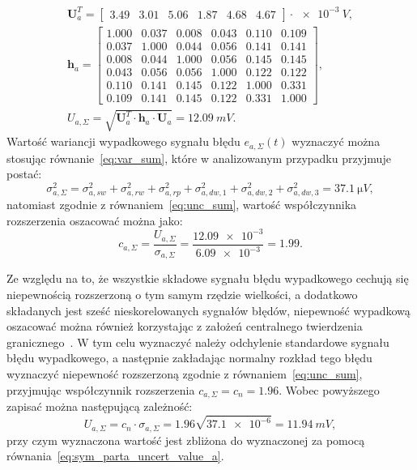\begin{gather}
\mathbf{U}_{a}^{T} =
\begin{bmatrix}
3.49 & 3.01 & 5.06 & 1.87 & 4.68 & 4.67
\end{bmatrix} \cdot \qty{e-3}{V}
\label{eq:sym_parta_uncert_vector_val}, \\
\mathbf{h}_{a} =
\begin{bmatrix}
1.000 & 0.037 & 0.008 & 0.043 & 0.110 & 0.109 \\
0.037 & 1.000 & 0.044 & 0.056 & 0.141 & 0.141 \\
0.008 & 0.044 & 1.000 & 0.056 & 0.145 & 0.145 \\
0.043 & 0.056 & 0.056 & 1.000 & 0.122 & 0.122 \\
0.110 & 0.141 & 0.145 & 0.122 & 1.000 & 0.331 \\
0.109 & 0.141 & 0.145 & 0.122 & 0.331 & 1.000
\end{bmatrix}
\label{eq:sym_parta_uncert_coher_val}, \\
U_{a,\Sigma} = \sqrt{\mathbf{U}_{a}^{T} \cdot \mathbf{h}_{a} \cdot \mathbf{U}_{a}} = \qty{12.09}{mV} \label{eq:sym_parta_uncert_value_a}.
\end{gather}
Wartość wariancji wypadkowego sygnału błędu $e_{a,\Sigma}(t)$ wyznaczyć można stosując równanie~\eqref{eq:var_sum}, które w analizowanym przypadku przyjmuje postać:
\begin{equation}
\sigma_{a,\Sigma}^{2} = \sigma_{a,sw}^{2} + \sigma_{a,rw}^{2} + \sigma_{a,rp}^{2} + \sigma_{a,dw,1}^{2} + \sigma_{a,dw,2}^{2} + \sigma_{a,dw,3}^{2} = \qty{37.1}{\micro V} \label{eq:sym_parta_var_sum},
\end{equation}
natomiast zgodnie z równaniem~\eqref{eq:unc_sum}, wartość współczynnika rozszerzenia oszacować można jako:
\begin{equation}
c_{a,\Sigma} = \frac{U_{a,\Sigma}}{\sigma_{a,\Sigma}} = \frac{\num{12.09e-3}}{\num{6.09e-3}} = 1.99 \label{eq:sym_parta_uncert_factor}.
\end{equation}

Ze względu na to, że wszystkie składowe sygnału błędu wypadkowego cechują się niepewnością rozszerzoną o tym samym rzędzie wielkości, a dodatkowo składanych jest sześć nieskorelowanych sygnałów błędów, niepewność wypadkową oszacować można również korzystając z założeń centralnego twierdzenia granicznego~\cite{jcgm_guide}. W tym celu wyznaczyć należy odchylenie standardowe sygnału błędu wypadkowego, a następnie zakładając normalny rozkład tego błędu wyznaczyć niepewność rozszerzoną zgodnie z równaniem~\eqref{eq:unc_sum}, przyjmując współczynnik rozszerzenia $c_{a,\Sigma} = c_{n} = 1.96$. Wobec powyższego zapisać można następującą zależność:
\begin{equation}
U_{a,\Sigma} = c_{n} \cdot \sigma_{a,\Sigma} = 1.96 \sqrt{\num{37.1e-6}} = \qty{11.94}{mV} \label{eq:sym_parta_uncert_value_b},
\end{equation}
przy czym wyznaczona wartość jest zbliżona do wyznaczonej za pomocą równania~\eqref{eq:sym_parta_uncert_value_a}.

